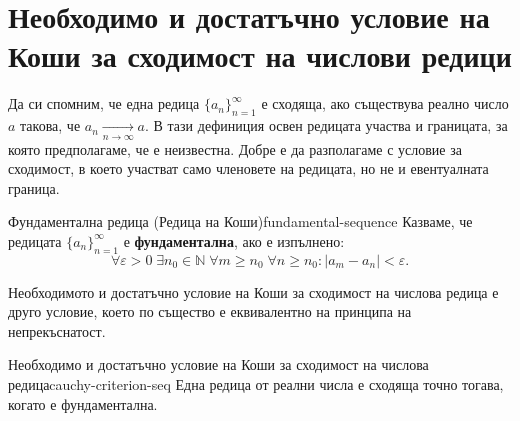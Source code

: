 \section{Необходимо и достатъчно условие на Коши за сходимост на числови редици}

Да си спомним, че една редица $\{a_n\}_{n=1}^{\infty}$ е сходяща, ако съществува реално число $a$ такова, че $a_n \xrightarrow[n\to\infty]{} a$. В тази дефиниция освен редицата участва и границата, за която предполагаме, че е неизвестна. Добре е да разполагаме с условие за сходимост, в което участват само членовете на редицата, но не и евентуалната граница.

\begin{definition}{Фундаментална редица (Редица на Коши)}{fundamental-sequence}
Казваме, че редицата $\{a_n\}_{n=1}^{\infty}$ е \textbf{фундаментална}, ако е изпълнено:
\[
\forall \varepsilon > 0 \; \exists n_0 \in \mathbb{N} \; \forall m \ge n_0 \; \forall n \ge n_0 \colon |a_m - a_n| < \varepsilon.
\]
\end{definition}

Необходимото и достатъчно условие на Коши за сходимост на числова редица е друго условие, което по същество е еквивалентно на принципа на непрекъснатост.

\begin{theorem}{Необходимо и достатъчно условие на Коши за сходимост на числова редица}{cauchy-criterion-seq}
Една редица от реални числа е сходяща точно тогава, когато е фундаментална.
\end{theorem}

